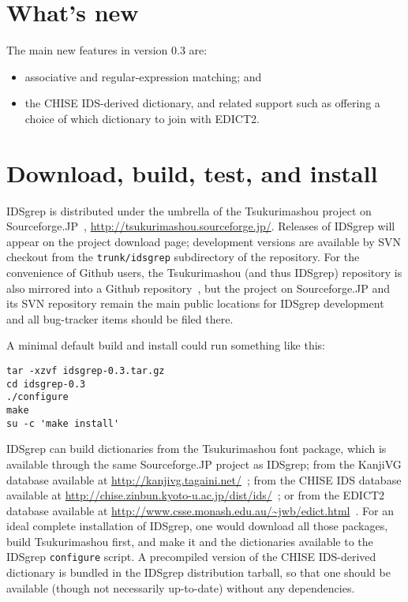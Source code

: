 \documentclass[twocolumn]{report}
\begin{document}
\section{What's new}

The main new features in version 0.3 are:
\begin{itemize}
\item associative and regular-expression matching; and
\item the CHISE IDS-derived dictionary, and related support such as
offering a choice of which dictionary to join with EDICT2.
\end{itemize}


\section{Download, build, test, and install}

IDSgrep is distributed under the umbrella of the Tsukurimashou project on
Sourceforge.JP~\cite{Tsukurimashou},
\url{http://tsukurimashou.sourceforge.jp/}.  Releases of IDSgrep
will appear on the project download page; development versions are available
by SVN checkout from the \texttt{trunk/idsgrep} subdirectory of the
repository.  For the convenience of Github users, the Tsukurimashou (and
thus IDSgrep) repository is also mirrored into a Github
repository~\cite{TsukuGithub}, but the project on Sourceforge.JP and its SVN
repository remain the main public locations for IDSgrep development and all
bug-tracker items should be filed there.

A minimal default build and install could run something like this:
\begin{verbatim}
tar -xzvf idsgrep-0.3.tar.gz
cd idsgrep-0.3
./configure
make
su -c 'make install'
\end{verbatim}

IDSgrep can build dictionaries
from the Tsukurimashou font package, which is available through the same
Sourceforge.JP project as IDSgrep; from the KanjiVG database available at
\url{http://kanjivg.tagaini.net/}~\cite{KanjiVG}; from the CHISE IDS
database available at
\url{http://chise.zinbun.kyoto-u.ac.jp/dist/ids/}~\cite{CHISE};
or from the EDICT2 database available at
\url{http://www.csse.monash.edu.au/~jwb/edict.html}~\cite{EDICT2}.  For an
ideal complete installation of IDSgrep, one would download all those
packages, build Tsukurimashou first, and make it and the dictionaries
available to the IDSgrep \texttt{configure} script.
A precompiled version of the CHISE IDS-derived dictionary is bundled
in the IDSgrep distribution tarball, so that one should be available (though
not necessarily up-to-date) without any dependencies.
\end{document}
